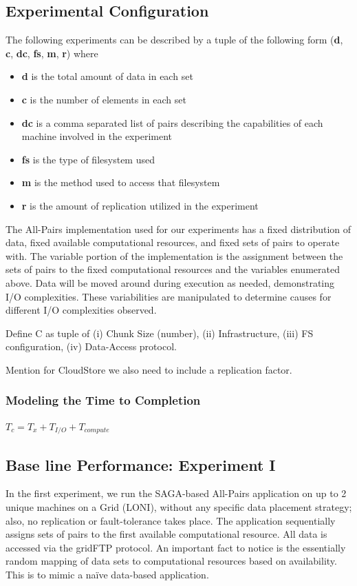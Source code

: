 \documentclass{rspublic}
\begin{document}
\subsection{Experimental Configuration}

The following experiments can be described by a tuple of the following form
(\textbf{d}, \textbf{c}, \textbf{dc}, \textbf{fs}, \textbf{m}, \textbf{r})
where

\begin{itemize} 
\item \textbf{d} is the total amount of data in each set
\item \textbf{c} is the number of elements in each set
\item \textbf{dc} is a comma separated list of pairs describing the
capabilities of each machine involved in the experiment
\item \textbf{fs} is the type of filesystem used
\item \textbf{m} is the method used to access that filesystem
\item \textbf{r} is the amount of replication utilized in the experiment
\end{itemize}

The All-Pairs implementation used for our experiments has a fixed distribution
of data, fixed available computational resources, and fixed sets of pairs to
operate with.  The variable portion of the implementation is the assignment
between the sets of pairs to the fixed computational resources and the
variables enumerated above.  Data will be moved around during execution as
needed, demonstrating I/O complexities.  These variabilities are manipulated to
determine causes for different I/O complexities observed.

Define C as  tuple of (i) Chunk Size (number), (ii) Infrastructure,
(iii) FS configuration, (iv) Data-Access protocol.

Mention for CloudStore we also need to include a replication factor.

\subsubsection{Modeling the Time to Completion}

$T_c = T_x + T_{I/O} + T_{compute}$

\subsection{Base line Performance: Experiment I} In the first experiment, we
run the SAGA-based All-Pairs application on up to 2 unique machines on a Grid
(LONI), without any specific data placement strategy; also, no replication or
fault-tolerance takes place.  The application sequentially assigns sets of
pairs to the first available computational resource.  All data is accessed via
the gridFTP protocol.  An important fact to notice is the essentially random
mapping of data sets to computational resources based on availability.  This is
to mimic a naïve data-based application.
\end{document}

